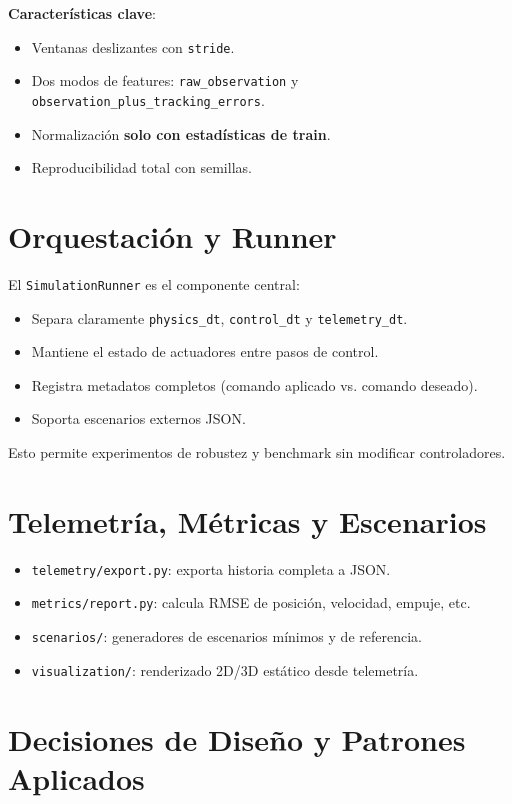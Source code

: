 \documentclass[12pt,a4paper]{article}
\begin{document}
\textbf{Características clave}:
\begin{itemize}
    \item Ventanas deslizantes con \texttt{stride}.
    \item Dos modos de features: \texttt{raw\_observation} y \texttt{observation\_plus\_tracking\_errors}.
    \item Normalización \textbf{solo con estadísticas de train}.
    \item Reproducibilidad total con semillas.
\end{itemize}

\section{Orquestación y Runner}

El \texttt{SimulationRunner} es el componente central:

\begin{itemize}
    \item Separa claramente \texttt{physics\_dt}, \texttt{control\_dt} y \texttt{telemetry\_dt}.
    \item Mantiene el estado de actuadores entre pasos de control.
    \item Registra metadatos completos (comando aplicado vs. comando deseado).
    \item Soporta escenarios externos JSON.
\end{itemize}

Esto permite experimentos de robustez y benchmark sin modificar controladores.

\section{Telemetría, Métricas y Escenarios}

\begin{itemize}
    \item \texttt{telemetry/export.py}: exporta historia completa a JSON.
    \item \texttt{metrics/report.py}: calcula RMSE de posición, velocidad, empuje, etc.
    \item \texttt{scenarios/}: generadores de escenarios mínimos y de referencia.
    \item \texttt{visualization/}: renderizado 2D/3D estático desde telemetría.
\end{itemize}

\section{Decisiones de Diseño y Patrones Aplicados}
\end{document}
